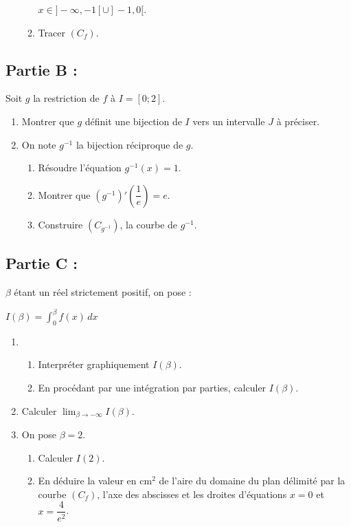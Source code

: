 \documentclass[12pt,a4paper]{article}
\begin{document}
\begin{multicols}{2}
\begin{enumerate}
\begin{enumerate}
     \( x \in ]-\infty, -1[ \cup ]-1, 0[ \).
    \item Tracer \( (C_f) \).
  \end{enumerate}
\end{enumerate}

\subsection*{Partie B : } Soit \( g \) la restriction de \( f \) à \( I = [0;2] \).
\begin{enumerate}
    \item Montrer que \( g \) définit une bijection de \( I \) vers un intervalle \( J \) à préciser.
    \item On note \( g^{-1} \) la bijection réciproque de \( g \).
    \begin{enumerate}
        \item Résoudre l’équation \( g^{-1}(x) = 1 \).
        \item Montrer que \( \left(g^{-1}\right)'\left(\dfrac{1}{e}\right) = e \).
        \item Construire \( (C_{g^{-1}}) \), la courbe de \( g^{-1} \).
    \end{enumerate}
\end{enumerate}


\subsection*{Partie C : } \( \beta \) étant un réel strictement positif, on pose :

\(I(\beta) = \int_0^{\beta} f(x)\,dx \)
\begin{enumerate}
    \item 
    \begin{enumerate}
        \item Interpréter graphiquement \( I(\beta) \).
        \item En procédant par une intégration par parties, calculer \( I(\beta) \).
    \end{enumerate}
    
    \item Calculer \( \lim_{\beta \to -\infty} I(\beta) \).
    
    \item On pose \( \beta = 2 \).
    \begin{enumerate}
        \item Calculer \( I(2) \).
        \item En déduire la valeur en \( \text{cm}^2 \) de l’aire du domaine du plan délimité par la courbe \( (C_f) \), l’axe des abscisses et les droites d’équations \( x = 0 \) et \( x = \dfrac{4}{e^2} \).
    \end{enumerate}
\end{enumerate}


\end{multicols}
\end{document}
